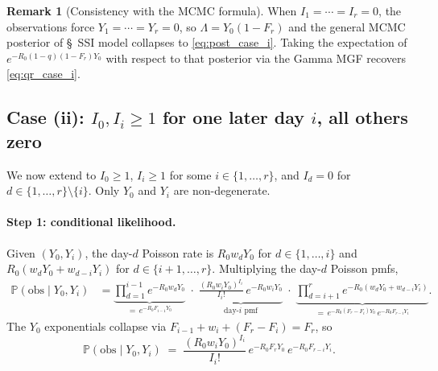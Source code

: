\documentclass{article}
\theoremstyle{definition}
\newtheorem*{remark}{Remark}
\begin{document}
\begin{remark}[Consistency with the MCMC formula]
  When $I_1 = \cdots = I_r = 0$, the observations force
  $Y_1 = \cdots = Y_r = 0$, so $\Lambda = Y_0(1 - F_r)$ and the
  general MCMC posterior of \S~SSI model collapses to
  \eqref{eq:post_case_i}.  Taking the expectation of
  $e^{-R_0(1-q)(1-F_r)Y_0}$ with respect to that posterior via the
  Gamma MGF recovers \eqref{eq:qr_case_i}.
\end{remark}

\subsection{Case (ii): \(I_0, I_i \geq 1\) for one later day \(i\),
all others zero}
\label{sec:ssi_case_ii}

We now extend to $I_0 \geq 1$, $I_i \geq 1$ for some
$i \in \{1, \ldots, r\}$, and $I_d = 0$ for
$d \in \{1, \ldots, r\} \setminus \{i\}$.  Only $Y_0$ and $Y_i$ are
non-degenerate.

\paragraph{Step 1: conditional likelihood.}
Given $(Y_0, Y_i)$, the day-$d$ Poisson rate is $R_0 w_d Y_0$ for
$d \in \{1, \ldots, i\}$ and $R_0(w_d Y_0 + w_{d-i} Y_i)$ for
$d \in \{i+1, \ldots, r\}$.  Multiplying the day-$d$ Poisson pmfs,
\begin{align*}
  \mathbb{P}(\mathrm{obs} \mid Y_0, Y_i)
  &= \underbrace{\prod_{d=1}^{i-1} e^{-R_0 w_d Y_0}}_{=\, e^{-R_0 F_{i-1} Y_0}}
  \;\cdot\;
  \underbrace{\frac{(R_0 w_i Y_0)^{I_i}}{I_i!}\, e^{-R_0 w_i
  Y_0}}_{\text{day-}i\text{ pmf}}
  \;\cdot\;
  \underbrace{\prod_{d=i+1}^{r} e^{-R_0(w_d Y_0 + w_{d-i} Y_i)}}_{=\,
  e^{-R_0(F_r - F_i) Y_0}\, e^{-R_0 F_{r-i} Y_i}}.
\end{align*}
The $Y_0$ exponentials collapse via $F_{i-1} + w_i + (F_r - F_i) = F_r$, so
\begin{equation}\label{eq:cl_case_ii}
  \mathbb{P}(\mathrm{obs} \mid Y_0, Y_i)
  \;=\; \frac{(R_0 w_i Y_0)^{I_i}}{I_i!}\,
  e^{-R_0 F_r Y_0}\, e^{-R_0 F_{r-i} Y_i}.
\end{equation}
\end{document}
